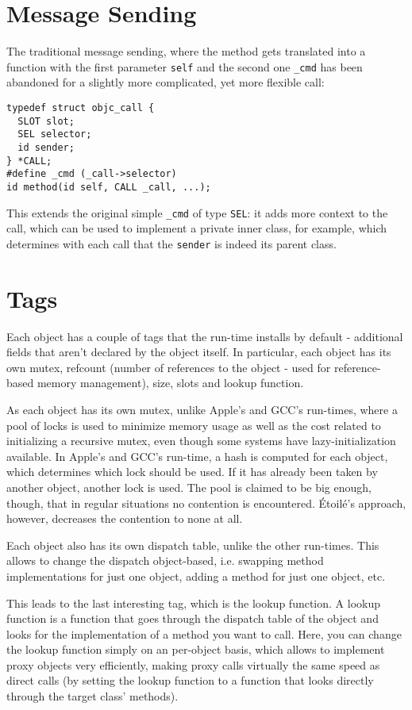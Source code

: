 \section{Message Sending}

The traditional message sending, where the method gets translated into a function with the first parameter \verb=self= and the second one \verb=_cmd= has been abandoned for a slightly more complicated, yet more flexible call:

\begin{verbatim}
typedef struct objc_call {
  SLOT slot;
  SEL selector;
  id sender;
} *CALL;
#define _cmd (_call->selector)
id method(id self, CALL _call, ...);
\end{verbatim}

This extends the original simple \verb=_cmd= of type \verb=SEL=: it adds more context to the call, which can be used to implement a private inner class, for example, which determines with each call that the \verb=sender= is indeed its parent class.

\section{Tags}

Each object has a couple of tags that the run-time installs by default - additional fields that aren't declared by the object itself. In particular, each object has its own mutex, refcount (number of references to the object - used for reference-based memory management), size, slots and lookup function.

As each object has its own mutex, unlike Apple's and GCC's run-times, where a pool of locks is used to minimize memory usage as well as the cost related to initializing a recursive mutex, even though some systems have lazy-initialization available. In Apple's and GCC's run-time, a hash is computed for each object, which determines which lock should be used. If it has already been taken by another object, another lock is used. The pool is claimed to be big enough, though, that in regular situations no contention is encountered. \'Etoil\'e's approach, however, decreases the contention to none at all.

Each object also has its own dispatch table, unlike the other run-times. This allows to change the dispatch object-based, i.e. swapping method implementations for just one object, adding a method for just one object, etc.

This leads to the last interesting tag, which is the lookup function. A lookup function is a function that goes through the dispatch table of the object and looks for the implementation of a method you want to call. Here, you can change the lookup function simply on an per-object basis, which allows to implement proxy objects very efficiently, making proxy calls virtually the same speed as direct calls (by setting the lookup function to a function that looks directly through the target class' methods).

